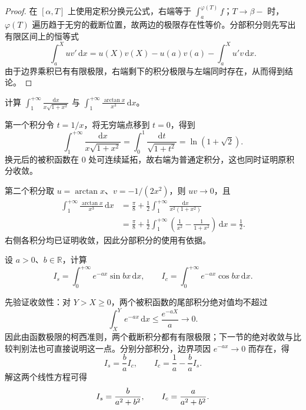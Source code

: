\begin{proof}
在 $[\alpha,T]$ 上使用定积分换元公式，右端等于 $\int_a^{\varphi(T)}f$；$T\to\beta-$ 时，$\varphi(T)$ 遍历趋于无穷的截断位置，故两边的极限存在性等价。分部积分则先写出有限区间上的恒等式
\[
    \int_a^X uv'\,\mathrm{d}x
    =u(X)v(X)-u(a)v(a)-\int_a^X u'v\,\mathrm{d}x.
\]
由于边界乘积已有有限极限，右端剩下的积分极限与左端同时存在，从而得到结论。
\end{proof}

\begin{example}
\label{ex:improper-substitution-and-parts-computations}
计算 $\int_1^{+\infty}\frac{\mathrm{d}x}{x\sqrt{1+x^2}}$ 与 $\int_1^{+\infty}\frac{\arctan x}{x^3}\,\mathrm{d}x$。
\end{example}

\begin{solve}
第一个积分令 $t=1/x$，将无穷端点移到 $t=0$，得到
\[
    \int_1^{+\infty}\frac{\mathrm{d}x}{x\sqrt{1+x^2}}
    =\int_0^1\frac{\mathrm{d}t}{\sqrt{1+t^2}}
    =\ln(1+\sqrt2).
\]
换元后的被积函数在 $0$ 处可连续延拓，故右端为普通定积分，这也同时证明原积分收敛。

第二个积分取 $u=\arctan x$、$v=-1/(2x^2)$，则 $uv\to0$，且
\begin{align*}
    \int_1^{+\infty}\frac{\arctan x}{x^3}\,\mathrm{d}x
    &=\frac\pi8+\frac12\int_1^{+\infty}
        \frac{\mathrm{d}x}{x^2(1+x^2)}\\
    &=\frac\pi8+\frac12\int_1^{+\infty}
        \left(\frac1{x^2}-\frac1{1+x^2}\right)\,\mathrm{d}x
      =\frac12.
\end{align*}
右侧各积分均已证明收敛，因此分部积分的使用有依据。
\end{solve}

\begin{example}
\label{ex:exponentially-damped-trigonometric-integrals}
设 $a>0$、$b\in\mathbb{R}$，计算
\[
    I_s=\int_0^{+\infty}e^{-ax}\sin bx\,\mathrm{d}x,
    \qquad
    I_c=\int_0^{+\infty}e^{-ax}\cos bx\,\mathrm{d}x.
\]
\end{example}

\begin{solve}
先验证收敛性：对 $Y>X\geq0$，两个被积函数的尾部积分绝对值均不超过
\[
    \int_X^Y e^{-ax}\,\mathrm{d}x\leq\frac{e^{-aX}}a\longrightarrow0.
\]
因此由函数极限的柯西准则，两个截断积分都有有限极限；下一节的绝对收敛与比较判别法也可直接说明这一点。分别分部积分，边界项因 $e^{-ax}\to0$ 而存在，得
\[
    I_s=\frac ba I_c,\qquad
    I_c=\frac1a-\frac ba I_s.
\]
解这两个线性方程可得
\[
    I_s=\frac{b}{a^2+b^2},\qquad
    I_c=\frac{a}{a^2+b^2}.
    \qedhere
\]
\end{solve}

